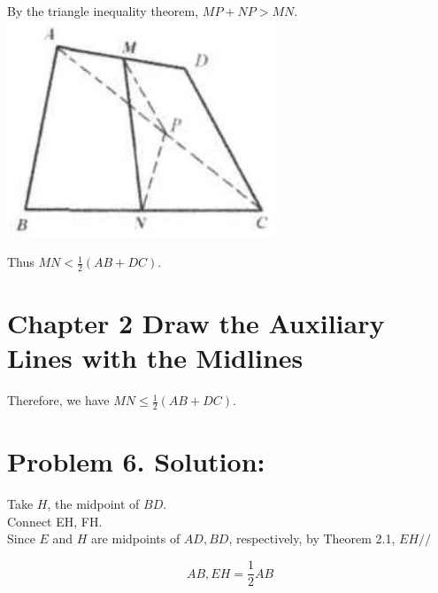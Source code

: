 \documentclass[10pt]{article}
\begin{document}
By the triangle inequality theorem, \(M P+N P>M N\).\\
\includegraphics[max width=\textwidth, center]{2025_04_17_97bc1f7e44d93c271a88g-049}

Thus \(M N<\frac{1}{2}(A B+D C)\).

\section*{Chapter 2 Draw the Auxiliary Lines with the Midlines}
Therefore, we have \(M N \leq \frac{1}{2}(A B+D C)\).

\section*{Problem 6. Solution:}
Take \(H\), the midpoint of \(B D\).\\
Connect EH, FH.\\
Since \(E\) and \(H\) are midpoints of \(A D, B D\), respectively, by Theorem 2.1, \(E H / /\)

\[
A B, E H=\frac{1}{2} A B
\]
\end{document}
